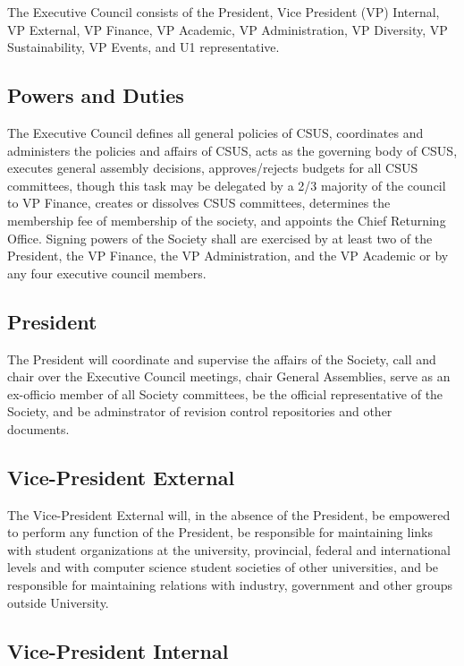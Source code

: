The Executive Council consists of the President, Vice President (VP)
Internal, VP External, VP Finance, VP Academic, VP Administration, VP
Diversity, VP Sustainability, VP Events, and U1 representative.

\subsection{Powers and Duties}\label{powers-and-duties}

The Executive Council defines all general policies of CSUS, coordinates
and administers the policies and affairs of CSUS, acts as the governing
body of CSUS, executes general assembly decisions, approves/rejects
budgets for all CSUS committees, though this task may be delegated by a
2/3 majority of the council to VP Finance, creates or dissolves CSUS
committees, determines the membership fee of membership of the society,
and appoints the Chief Returning Office. Signing powers of the Society
shall are exercised by at least two of the President, the VP Finance,
the VP Administration, and the VP Academic or by any four executive
council members.

\subsection{President}\label{president}

The President will coordinate and supervise the affairs of the Society,
call and chair over the Executive Council meetings, chair General
Assemblies, serve as an ex-officio member of all Society committees, be
the official representative of the Society, and be adminstrator of
revision control repositories and other documents.

\subsection{Vice-President External}\label{vice-president-external}

The Vice-President External will, in the absence of the President, be
empowered to perform any function of the President, be responsible for
maintaining links with student organizations at the university,
provincial, federal and international levels and with computer science
student societies of other universities, and be responsible for
maintaining relations with industry, government and other groups outside
University.

\subsection{Vice-President Internal}\label{vice-president-internal}

